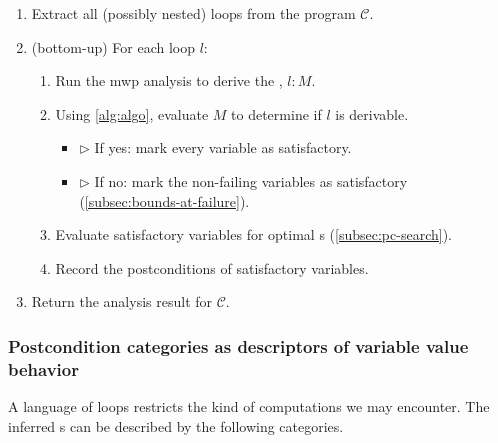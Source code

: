 \begin{enumerate}
\item Extract all (possibly nested) loops from the
program \(\mathcal{C}\).
\item (bottom-up) For each loop \(l\):
\begin{enumerate}[label=(\roman*)]
\item Run the mwp analysis to derive the , \(l :
M\).
\item Using \autoref{alg:algo}, evaluate \(M\) to determine if
\(l\) is derivable.
\begin{itemize}
    \item[] \(\triangleright\) If yes: mark every variable as satisfactory.
    \item[] \(\triangleright\) If no: mark the non-failing variables as
    satisfactory (\autoref{subsec:bounds-at-failure}).
\end{itemize}
\item Evaluate satisfactory variables for optimal s
(\autoref{subsec:pc-search}).
\item Record the postconditions of satisfactory variables.
\end{enumerate}
\item Return the analysis result for \(\mathcal{C}\).
\end{enumerate}

\subsubsection{Postcondition categories as descriptors of variable value
behavior}
\label{subsec:disclaimer}

A language of loops restricts the kind of computations we may encounter. The
inferred s can be described by the following categories.

